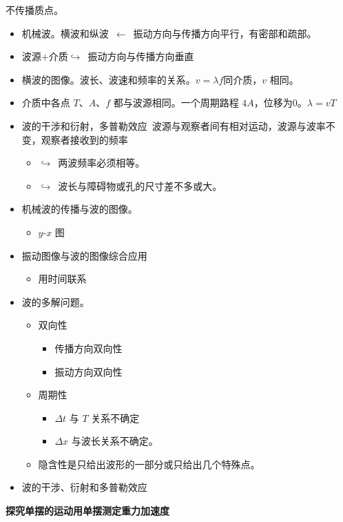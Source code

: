 不传播质点。
\begin{itemize}
\item 机械波。横波和纵波\ $\leftarrow$\ 振动方向与传播方向平行，有密部和疏部。
\item 波源$+$介质\quad $\hookrightarrow$\ 振动方向与传播方向垂直
\item 横波的图像。波长、波速和频率的关系。\quad $v=\lambda f$\quad 同介质，$v$ 相同。
\item 介质中各点 $T$、$A$、$f$ 都与波源相同。一个周期路程 $4A$，位移为0。\quad $\lambda=vT$
\item 波的干涉和衍射，多普勒效应\ 波源与观察者间有相对运动，波源与波率不变，观察者接收到的频率
  \begin{itemize}
  \item $\hookrightarrow$\ 两波频率必须相等。
  \item $\hookrightarrow$\ 波长与障碍物或孔的尺寸差不多或大。
  \end{itemize}
\end{itemize}
\begin{itemize}
\item 机械波的传播与波的图像。
  \begin{itemize}
  \item $y$-$x$ 图
  \end{itemize}
\item 振动图像与波的图像综合应用
  \begin{itemize}
  \item 用时间联系
  \end{itemize}
\item 波的多解问题。
  \begin{itemize}
  \item 双向性
    \begin{itemize}
    \item 传播方向双向性
    \item 振动方向双向性
    \end{itemize}
  \item 周期性
    \begin{itemize}
    \item $\Delta t$ 与 $T$ 关系不确定
    \item $\Delta x$ 与波长关系不确定。
    \end{itemize}
  \item 隐含性\quad 是只给出波形的一部分或只给出几个特殊点。
  \end{itemize}
\item 波的干涉、衍射和多普勒效应
\end{itemize}
\textbf{探究单摆的运动\quad 用单摆测定重力加速度}

